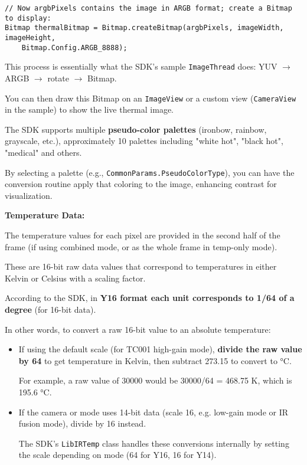 {\begin{verbatim}
// Now argbPixels contains the image in ARGB format; create a Bitmap to display:
Bitmap thermalBitmap = Bitmap.createBitmap(argbPixels, imageWidth, imageHeight, 
    Bitmap.Config.ARGB_8888);
\end{verbatim}

This process is essentially what the SDK's sample \texttt{ImageThread} does:
YUV $\rightarrow$ ARGB $\rightarrow$ rotate $\rightarrow$ Bitmap.

You can then draw this Bitmap on an \texttt{ImageView} or a custom view
(\texttt{CameraView} in the sample) to show the live thermal image.

The SDK supports multiple \textbf{pseudo-color palettes}
(ironbow, rainbow, grayscale, etc.), approximately 10 palettes including "white
hot", "black hot", "medical" and others.

By selecting a palette (e.g., \texttt{CommonParams.PseudoColorType}), you can
have the conversion routine apply that coloring to the image, enhancing contrast
for visualization.

\textbf{Temperature Data:}

The temperature values for each pixel are provided in the second half of the
frame (if using combined mode, or as the whole frame in temp-only mode).

These are 16-bit raw data values that correspond to temperatures in either
Kelvin or Celsius with a scaling factor.

According to the SDK, in \textbf{Y16 format each unit corresponds to 1/64 of a degree}
 (for 16-bit data).

In other words, to convert a raw 16-bit value to an absolute temperature:
\begin{itemize}

\item If using the default scale (for TC001 high-gain mode), \textbf{divide the raw value by 64}
 to get temperature in Kelvin, then subtract 273.15 to convert to °C.

For example, a raw value of 30000 would be 30000/64 = 468.75 K, which is 195.6
°C.

\item If the camera or mode uses 14-bit data (scale 16, e.g. low-gain mode or IR
fusion mode), divide by 16 instead.

The SDK's \texttt{LibIRTemp} class handles these conversions internally by
setting the scale depending on mode (64 for Y16, 16 for Y14).

\end{itemize}

}
